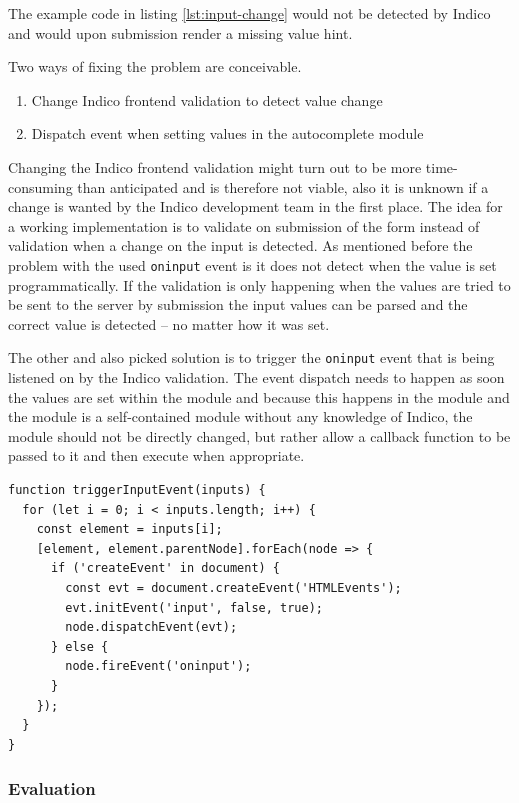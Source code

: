 The example code in listing \ref{lst:input-change} would not be detected by Indico and would upon submission render a missing value hint.

Two ways of fixing the problem are conceivable.

\begin{enumerate}
    \item Change Indico frontend validation to detect value change
    \item Dispatch event when setting values in the autocomplete module
\end{enumerate}

Changing the Indico frontend validation might turn out to be more time-consuming than anticipated and is therefore not viable, also it is unknown if a change is wanted by the Indico development team in the first place. The idea for a working implementation is to validate on submission of the form instead of validation when a change on the input is detected. As mentioned before the problem with the used \texttt{oninput} event is it does not detect when the value is set programmatically. If the validation is only happening when the values are tried to be sent to the server by submission the input values can be parsed and the correct value is detected -- no matter how it was set. 

The other and also picked solution is to trigger the \texttt{oninput} event that is being listened on by the Indico validation. The event dispatch needs to happen as soon the values are set within the module and because this happens in the module and the module is a self-contained module without any knowledge of Indico, the module should not be directly changed, but rather allow a callback function to be passed to it and then execute when appropriate.

\begin{lstlisting}[language=Other,columns=fullflexible, caption={Dispatching the \texttt{oninput} event within a callback.}, label={lst:oninput-callback}]
function triggerInputEvent(inputs) {
  for (let i = 0; i < inputs.length; i++) {
    const element = inputs[i];
    [element, element.parentNode].forEach(node => {
      if ('createEvent' in document) {
        const evt = document.createEvent('HTMLEvents');
        evt.initEvent('input', false, true);
        node.dispatchEvent(evt);
      } else {
        node.fireEvent('oninput');
      }
    });
  }
}
\end{lstlisting}

\subsubsection{Evaluation}\mbox{}\\

